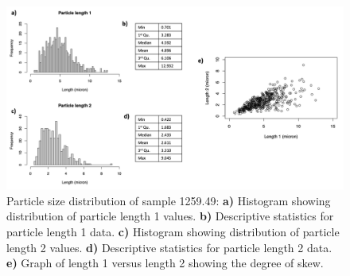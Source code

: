 \begin{figure}[H]
\centering
  \includegraphics[width=\linewidth]{1259-49_partsize}
\caption[Particle size distribution, sample 1259.49.]{Particle size distribution of sample 1259.49: \textbf{a)} Histogram showing distribution of particle length 1 values. \textbf{b)} Descriptive statistics for particle length 1 data. \textbf{c)} Histogram showing distribution of particle length 2 values. \textbf{d)} Descriptive statistics for particle length 2 data. \textbf{e)} Graph of length 1 versus length 2 showing the degree of skew.}
\label{fig:1259.49_partsize}
\end{figure}






